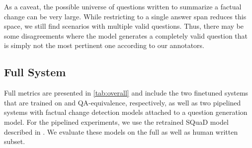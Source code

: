 As a caveat, the possible universe of questions written to summarize a factual change can be very large. While restricting to a single answer span reduces this space, we still find scenarios with multiple valid questions. Thus, there may be some disagreements where the model generates a completely valid question that is simply not the most pertinent one according to our annotators. 











\subsection{Full System}


Full \dataset{} metrics are presented in \autoref{tab:overall} and include the two finetuned systems that are trained on \vitaminc{} and QA-equivalence, respectively, as well as two pipelined systems with factual change detection models attached to a question generation model. For the pipelined experiments, we use the retrained SQuaD model described in . We evaluate these models on the full \dataset{} as well as human written subset.  

